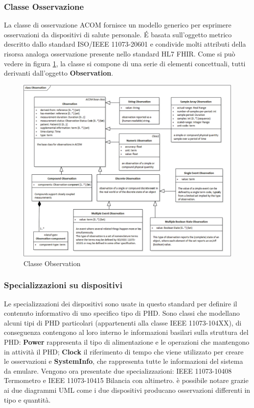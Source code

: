 \documentclass[a4paper]{article}
\begin{document}
\subsubsection{Classe Osservazione}
La classe di osservazione ACOM fornisce un modello generico per esprimere osservazioni da dispositivi di salute personale.
\'E basata sull'oggetto metrico descritto dallo standard ISO/IEEE 11073-20601 e condivide molti attributi della risorsa analoga osservazione presente nello standard HL7 FHIR.
Come si può vedere in figura \ref{fig:observationClass}, la classe si compone di una serie di elementi concettuali, tutti derivanti dall'oggetto \textbf{Observation}.

\begin{figure}[H]
    \centering
    \includegraphics[width=1\textwidth]{figures/observation class.png}
    \caption{Classe Observation}
    \label{fig:observationClass}
\end{figure}

\subsubsection{Specializzazioni su dispositivi}
Le specializzazioni dei dispositivi sono usate in questo standard per definire il contenuto informativo di uno specifico tipo di PHD. 
Sono classi che modellano alcuni tipi di PHD particolari (appartenenti alla classe IEEE 11073-104XX), di conseguenza contengono al loro interno le informazioni basilari sulla struttura del PHD: \textbf{Power} rappresenta il tipo di alimentazione e le operazioni che mantengono in attività il PHD; \textbf{Clock} il riferimento di tempo che viene utilizzato per creare le osservazioni e \textbf{SystemInfo}, che rappresenta tutte le informazioni del sistema da emulare.
Vengono ora presentate due specializzazioni: IEEE 11073-10408 Termometro e IEEE 11073-10415 Bilancia con altimetro. è possibile notare grazie ai due diagrammi UML come i due dispositivi producano osservazioni differenti in tipo e quantità.
\end{document}
